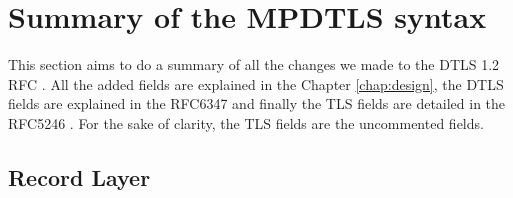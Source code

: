 \chapter{Summary of the MPDTLS syntax}

This section aims to do a summary of all the changes we made to the DTLS 1.2 RFC \cite{rfc6347}. All the added fields are explained in the Chapter \ref{chap:design}, the DTLS fields are explained in the RFC6347 and finally the TLS fields are detailed in the RFC5246 \cite{rfc5246}. For the sake of clarity, the TLS fields are the uncommented fields.

\section{Record Layer}
